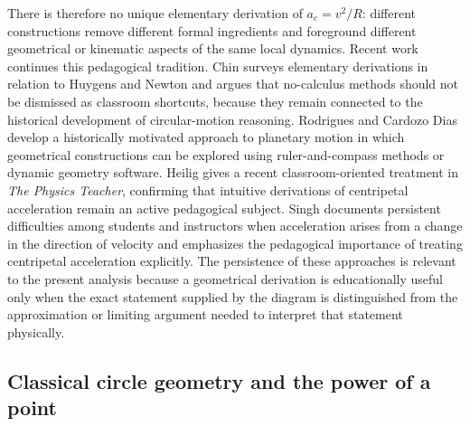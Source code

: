 \documentclass[preprint,12pt,3p,nopreprintline]{elsarticle}
\numberwithin{equation}{section}
\theoremstyle{remark}
\begin{document}
There is therefore no unique elementary derivation of $a_c=v^2/R$: different constructions remove different formal ingredients and foreground different geometrical or kinematic aspects of the same local dynamics. Recent work continues this pedagogical tradition. Chin \cite{chin2022elementary} surveys elementary derivations in relation to Huygens and Newton and argues that no-calculus methods should not be dismissed as classroom shortcuts, because they remain connected to the historical development of circular-motion reasoning. Rodrigues and Cardozo Dias \cite{rodrigues2022planetary} develop a historically motivated approach to planetary motion in which geometrical constructions can be explored using ruler-and-compass methods or dynamic geometry software. Heilig \cite{heilig2026intuitive} gives a recent classroom-oriented treatment in \textit{The Physics Teacher}, confirming that intuitive derivations of centripetal acceleration remain an active pedagogical subject. Singh \cite{singh2009centripetal} documents persistent difficulties among students and instructors when acceleration arises from a change in the direction of velocity and emphasizes the pedagogical importance of treating centripetal acceleration explicitly. The persistence of these approaches is relevant to the present analysis because a geometrical derivation is educationally useful only when the exact statement supplied by the diagram is distinguished from the approximation or limiting argument needed to interpret that statement physically.

\subsection{Classical circle geometry and the power of a point}
\end{document}
